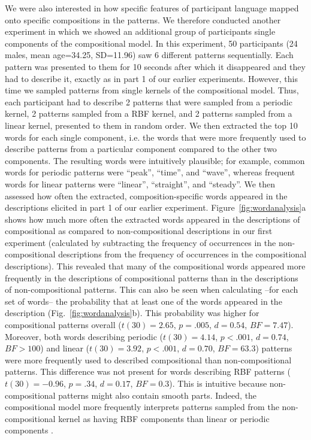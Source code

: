 \documentclass[a4paper,man, floatsintext, natbib]{apa6}
\begin{document}
We were also interested in how specific features of participant language mapped onto specific compositions in the patterns. We therefore conducted another experiment in which we showed an additional group of participants single components of the compositional model. In this experiment, 50 participants (24 males, mean age=34.25, SD=11.96) saw 6 different patterns sequentially. Each pattern was presented to them for 10 seconds after which it disappeared and they had to describe it, exactly as in part 1 of our earlier experiments. However, this time we sampled patterns from single kernels of the compositional model. Thus, each participant had to describe 2 patterns that were sampled from a periodic kernel, 2 patterns sampled from a RBF kernel, and 2 patterns sampled from a linear kernel, presented to them in random order. We then extracted the top 10 words for each single component, i.e. the words that were more frequently used to describe patterns from a particular component compared to the other two components. The resulting words were intuitively plausible; for example, common words for periodic patterns were ``peak'', ``time'', and ``wave'', whereas frequent words for linear patterns were ``linear'', ``straight'', and ``steady''. We then assessed how often the extracted, composition-specific words appeared in the descriptions elicited in part 1 of our earlier experiment. Figure~\ref{fig:wordanalysis}a shows how much more often the extracted words appeared in the descriptions of compositional as compared to non-compositional descriptions in our first experiment (calculated by subtracting the frequency of occurrences in the non-compositional descriptions from the frequency of occurrences in the compositional descriptions). This revealed that many of the compositional words appeared more frequently in the descriptions of compositional patterns than in the descriptions of non-compositional patterns. This can also be seen when calculating --for each set of words-- the probability that at least one of the words appeared in the description (Fig.~\ref{fig:wordanalysis}b). This probability was higher for compositional patterns overall ($t(30)= 2.65$, $p=.005$, $d=0.54$, $BF=7.47$). Moreover, both words describing periodic ($t(30)=4.14$, $p<.001$, $d=0.74$, $BF>100$) and linear ($t(30)= 3.92$, $p<.001$, $d=0.70$, $BF=63.3$) patterns were more frequently used to described compositional than non-compositional patterns. This difference was not present for words describing RBF patterns  ($t(30)=-0.96$, $p=.34$, $d=0.17$, $BF=0.3$). This is intuitive because non-compositional patterns might also contain smooth parts. Indeed, the compositional model more frequently interprets patterns sampled from the non-compositional kernel as having RBF components than linear or periodic components \citep[cf.][]{schulz2017compositional}.
\end{document}
